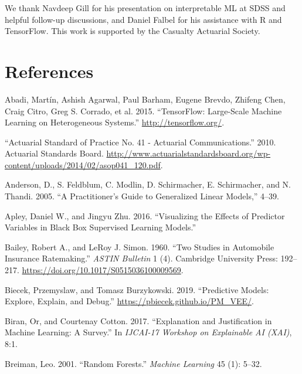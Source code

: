 \documentclass[preprint, 3p, twocolumn, letterpaper, 10pt]{elsarticle} %
\begin{document}
We thank Navdeep Gill for his presentation on interpretable ML at SDSS and
helpful follow-up discussions, and Daniel Falbel for his assistance with R and
TensorFlow.
This work is supported by the Casualty Actuarial Society.

\hypertarget{references}{%
\section*{References}\label{references}}

\hypertarget{refs}{}
\leavevmode\hypertarget{ref-tensorflow2015-whitepaper}{}%
Abadi, Martín, Ashish Agarwal, Paul Barham, Eugene Brevdo, Zhifeng Chen, Craig Citro, Greg S. Corrado, et al. 2015. ``TensorFlow: Large-Scale Machine Learning on Heterogeneous Systems.'' \url{http://tensorflow.org/}.

\leavevmode\hypertarget{ref-asop_41}{}%
``Actuarial Standard of Practice No. 41 - Actuarial Communications.'' 2010. Actuarial Standards Board. \url{http://www.actuarialstandardsboard.org/wp-content/uploads/2014/02/asop041_120.pdf}.

\leavevmode\hypertarget{ref-anderson_2005}{}%
Anderson, D., S. Feldblum, C. Modlin, D. Schirmacher, E. Schirmacher, and N. Thandi. 2005. ``A Practitioner's Guide to Generalized Linear Models,'' 4--39.

\leavevmode\hypertarget{ref-apley2016visualizing}{}%
Apley, Daniel W., and Jingyu Zhu. 2016. ``Visualizing the Effects of Predictor Variables in Black Box Supervised Learning Models.''

\leavevmode\hypertarget{ref-bailey_simon_1960}{}%
Bailey, Robert A., and LeRoy J. Simon. 1960. ``Two Studies in Automobile Insurance Ratemaking.'' \emph{ASTIN Bulletin} 1 (4). Cambridge University Press: 192--217. \url{https://doi.org/10.1017/S0515036100009569}.

\leavevmode\hypertarget{ref-biecekPMVEE}{}%
Biecek, Przemyslaw, and Tomasz Burzykowski. 2019. ``Predictive Models: Explore, Explain, and Debug.'' \url{https://pbiecek.github.io/PM_VEE/}.

\leavevmode\hypertarget{ref-biranExplanationJustification2017}{}%
Biran, Or, and Courtenay Cotton. 2017. ``Explanation and Justification in Machine Learning: A Survey.'' In \emph{IJCAI-17 Workshop on Explainable AI (XAI)}, 8:1.

\leavevmode\hypertarget{ref-breimanRandomForests2001}{}%
Breiman, Leo. 2001. ``Random Forests.'' \emph{Machine Learning} 45 (1): 5--32.
\end{document}

